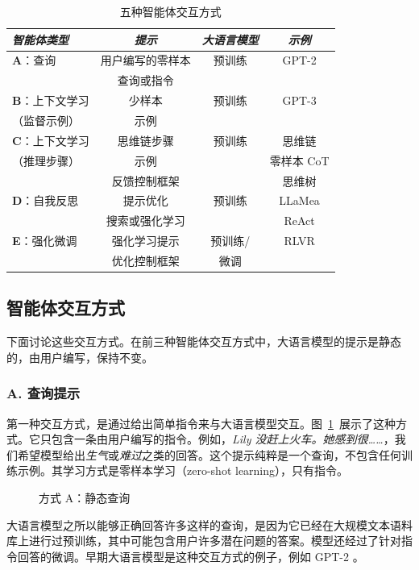 \begin{table}
\footnotesize\centering
\begin{tabular}{l|c|c|c}
{\em 智能体类型} & {\em 提示} & {\em 大语言模型} & {\em 示例} \\ \hline
{\bf A}：查询 & 用户编写的零样本 & 预训练 & GPT-2 \citep{vaswani2017attention}\\
 & 查询或指令 & & \\ \hline
{\bf B}：上下文学习 & 少样本 & 预训练 & GPT-3 \citep{brown2020language}\\
（监督示例） & 示例 & & \\ \hline
{\bf C}：上下文学习 & 思维链步骤 & 预训练 & 思维链 \citep{wei2022chain}\\
（推理步骤） & 示例 & & 零样本 CoT \citep{kojima2022large}\\ \hline
 & 反馈控制框架 & & 思维树 \citep{yao2024tree}\\
{\bf D}：自我反思 & 提示优化 & 预训练 & LLaMea \citep{van2024llamea}\\
 & 搜索或强化学习 & & ReAct \citep{yao2022react}\\ \hline
{\bf E}：强化微调 & 强化学习提示 & 预训练/ & RLVR \citep{lambert2024tulu}\\
 & 优化控制框架 & 微调 & \\
\end{tabular}
    \caption{五种智能体交互方式}\label{tab:fourstyles}
\end{table}





\subsection{智能体交互方式}
下面讨论这些交互方式。在前三种智能体交互方式中，大语言模型的提示是静态的，由用户编写，保持不变。


\subsubsection{A. 查询提示}
第一种交互方式，是通过给出简单指令来与大语言模型交互。图~\ref{fig:rlA}~展示了这种方式。它只包含一条由用户编写的指令。例如，{\em Lily 没赶上火车。她感到很……}，我们希望模型给出{\em 生气}或{\em 难过}之类的回答。这个提示纯粹是一个查询，不包含任何训练示例。其学习方式是零样本学习（zero-shot learning），只有指令。
\begin{figure}
  \begin{center}
    
    \caption{方式 A：静态查询}\label{fig:rlA}
  \end{center}
\end{figure}
大语言模型之所以能够正确回答许多这样的查询，是因为它已经在大规模文本语料库上进行过预训练，其中可能包含用户许多潜在问题的答案。模型还经过了针对指令回答的微调。早期大语言模型是这种交互方式的例子，例如 GPT-2 \citep{vaswani2017attention}。


